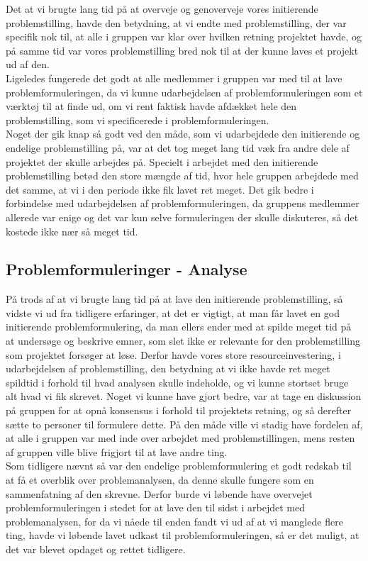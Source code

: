 \documentclass[a4paper,12pt,oneside,article]{memoir}
\begin{document}
        Det at vi brugte lang tid på at overveje og genoverveje vores initierende problemstilling, havde den betydning, at vi endte med problemstilling, der var specifik nok til, at alle i gruppen var klar over hvilken retning projektet havde, og på samme tid var vores problemstilling bred nok til at der kunne laves et projekt ud af den.\\
        Ligeledes fungerede det godt at alle medlemmer i gruppen var med til at lave problemformuleringen, da vi kunne udarbejdelsen af problemformuleringen som et værktøj til at finde ud, om vi rent faktisk havde afdækket hele den problemstilling, som vi specificerede i problemformuleringen.\\
        Noget der gik knap så godt ved den måde, som vi udarbejdede den initierende og endelige problemstilling på, var at det tog meget lang tid væk fra andre dele af projektet der skulle arbejdes på. Specielt i arbejdet med den initierende problemstilling betød den store mængde af tid, hvor hele gruppen arbejdede med det samme, at vi i den periode ikke fik lavet ret meget. Det gik bedre i forbindelse med udarbejdelsen af problemformuleringen, da gruppens medlemmer allerede var enige og det var kun selve formuleringen der skulle diskuteres, så det kostede ikke nær så meget tid.

        \subsection{Problemformuleringer - Analyse}

        På trods af at vi brugte lang tid på at lave den initierende problemstilling, så vidste vi ud fra tidligere erfaringer, at det er vigtigt, at man får lavet en god initierende problemformulering, da man ellers ender med at spilde meget tid på at undersøge og beskrive emner, som slet ikke er relevante for den problemstilling som projektet forsøger at løse. Derfor havde vores store resourceinvestering, i udarbejdelsen af problemstilling, den betydning at vi ikke havde ret meget spildtid i forhold til hvad analysen skulle indeholde, og vi kunne stortset bruge alt hvad vi fik skrevet. Noget vi kunne have gjort bedre, var at tage en diskussion på gruppen for at opnå konsensus i forhold til projektets retning, og så derefter sætte to personer til formulere dette. På den måde ville vi stadig have fordelen af, at alle i gruppen var med inde over arbejdet med problemstillingen, mens resten af gruppen ville blive frigjort til at lave andre ting. \\
        Som tidligere nævnt så var den endelige problemformulering et godt redskab til at få et overblik over problemanalysen, da denne skulle fungere som en sammenfatning af den skrevne. Derfor burde vi løbende have overvejet problemformuleringen i stedet for at lave den til sidst i arbejdet med problemanalysen, for da vi nåede til enden fandt vi ud af at vi manglede flere ting, havde vi løbende lavet udkast til problemformuleringen, så er det muligt, at det var blevet opdaget og rettet tidligere.
\end{document}
